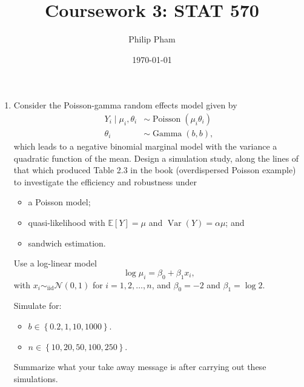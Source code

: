 \documentclass[letterpaper,11pt]{article}
\title{Coursework 3: STAT 570}
\author{Philip Pham}
\date{\today}
\begin{document}
\maketitle

\begin{enumerate}
\item Consider the Poisson-gamma random effects model given by
  \begin{align}
    Y_i \mid \mu_i, \theta_i
    &\sim \operatorname{Poisson}\left(\mu_i\theta_i\right) \\
    \theta_i
    &\sim \operatorname{Gamma}\left(b, b\right),
  \end{align}
  which leads to a negative binomial marginal model with the variance a
  quadratic function of the mean. Design a simulation study, along the lines of
  that which produced Table 2.3 in the book (overdispersed Poisson example) to
  investigate the efficiency and robustness under
  \begin{itemize}
  \item a Poisson model;
  \item quasi-likelihood with $\mathbb{E}\left[Y\right] = \mu$ and
    $\operatorname{Var}\left(Y\right) = \alpha\mu$; and
  \item sandwich estimation.
  \end{itemize}

  Use a log-linear model
  \begin{equation}
    \log \mu_i = \beta_0 + \beta_1x_i,
  \end{equation}
  with $x_i \sim_\mathrm{iid} \mathcal{N}\left(0, 1\right)$ for
  $i = 1,2,\ldots,n$, and $\beta_0 = -2$ and $\beta_1 = \log 2$.

  Simulate for:
  \begin{itemize}    
  \item $b \in \left\{0.2,1,10,1000\right\}$.
  \item $n \in \left\{10, 20, 50, 100, 250\right\}$.
  \end{itemize}

  Summarize what your take away message is after carrying out these simulations.


\end{enumerate}
\end{document}
